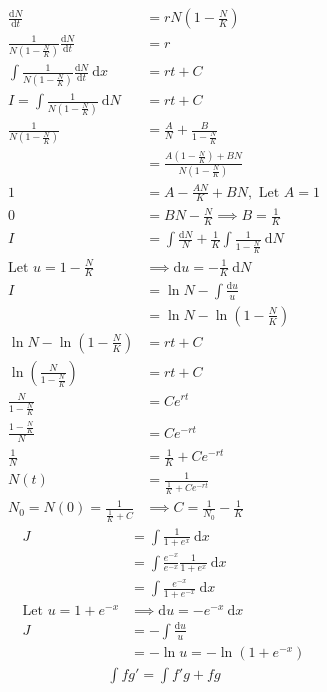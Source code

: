 \documentclass[a4paper,11pt]{article}
\theoremstyle{plain}
\theoremstyle{definition}
\newcommand{\dx}{\text{d}}
\begin{document}
\begin{align*}
	\frac{\dx N}{\dx t} &= rN\left(1-\frac{N}{K}\right) \\
	\frac{1}{N\left(1-\frac{N}{K}\right)}\frac{\dx N}{\dx t} &= r \\
	\int\frac{1}{N\left(1-\frac{N}{K}\right)}\frac{\dx N}{\dx t}\ \dx x&=rt+C \\
	I = \int\frac{1}{N\left(1-\frac{N}{K}\right)}\ \dx N&=rt+C \\
	\frac{1}{N\left(1-\frac{N}{K}\right)}
	&=\frac{A}{N}+\frac{B}{1-\frac{N}{K}}\\
	&=\frac{A\left(1-\frac{N}{K}\right)+BN}{N\left(1-\frac{N}{K}\right)}\\
	1&=A-\frac{AN}{K}+BN, \text{ Let } A= 1\\
	0&=BN-\frac{N}{K} \implies B= \frac{1}{K} \\
	I&=\int \frac{\dx N}{N}+\frac{1}{K}\int \frac{1}{1-\frac{N}{K}}\ \dx N\\
	\text{Let } u = 1-\frac{N}{K}&\implies \dx u = -\frac{1}{K}\ \dx N\\
	I&= \ln N - \int \frac{\dx u}{u}\\
	 &= \ln N - \ln \left(1-\frac{N}{K}\right) \\
	\ln N - \ln \left(1-\frac{N}{K}\right) &= rt+C\\
	\ln \left(\frac{N}{1-\frac{N}{K}}\right) &= rt+C\\
	\frac{N}{1-\frac{N}{K}} &= Ce^{rt}\\
	\frac{1-\frac{N}{K}}{N} &= Ce^{-rt}\\
	\frac{1}{N} &=\frac{1}{K}+ Ce^{-rt}\\
	N(t) &=\frac{1}{\frac{1}{K}+ Ce^{-rt}}\\
	N_0 = N(0) = \frac{1}{\frac{1}{K}+C} &\implies C = \frac{1}{N_0}-\frac{1}{K}
\end{align*}
\begin{align*}
	J&=\int \frac{1}{1+e^x}\ \dx x\\
	 &=\int \frac{e^{-x}}{e^{-x}}\frac{1}{1+e^x}\ \dx x\\
	 &=\int \frac{e^{-x}}{1+e^{-x}}\ \dx x\\
	\text{Let } u=1+e^{-x} &\implies \dx u = -e^{-x}\ \dx x\\
	J&=-\int \frac{\dx u}{u}\\
	 &= -\ln u = -\ln \left(1+e^{-x}\right)
\end{align*}
\begin{align*}
	\int fg' = \int f'g+fg
\end{align*}
\end{document}
